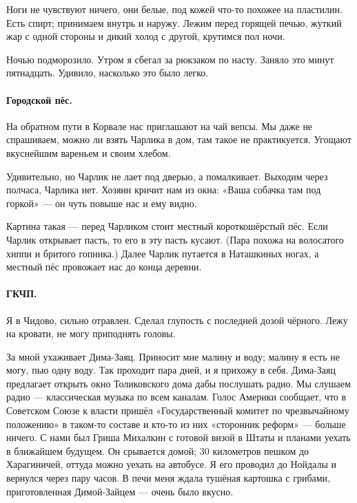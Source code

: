 \documentclass{book}
\begin{document}
Ноги не чувствуют ничего, они белые, под кожей что-то похожее на пластилин.
Есть спирт; принимаем внутрь и наружу.
Лежим перед горящей печью, жуткий жар с одной стороны и дикий холод с другой, крутимся пол ночи.

Ночью подморозило.
Утром я сбегал за рюкзаком по насту.
Заняло это минут пятнадцать.
Удивило, насколько это было легко.

\paragraph{Городской пёс.}

На обратном пути в Корвале нас приглашают на чай вепсы.
Мы даже не спрашиваем, можно ли взять Чарлика в дом, там такое не практикуется.
Угощают вкуснейшим вареньем и своим хлебом.

Удивительно, но Чарлик не лает под дверью, а помалкивает.
Выходим через полчаса, Чарлика нет.
Хозяин кричит нам из окна: «Ваша собачка там под горкой» --- он чуть повыше нас и ему видно.

Картина такая --- перед Чарликом стоит местный короткошёрстый пёс.
Если Чарлик открывает пасть, то его в эту пасть кусают.
(Пара похожа на волосатого хиппи и бритого гопника.)
Далее Чарлик путается в Наташкиных ногах, а местный пёс провожает нас до конца деревни.

\paragraph{ГКЧП.}

Я в Чидово, сильно отравлен.
Сделал глупость с последней дозой чёрного.
Лежу на кровати, не могу приподнять головы.

За мной ухаживает Дима-Заяц.
Приносит мне малину и воду; малину я есть не могу, пью одну воду.
Так проходит пара дней, и я прихожу в себя.
Дима-Заяц предлагает открыть окно Толиковского дома дабы послушать радио. 
Мы слушаем радио --- классическая музыка по всем каналам.
Голос Америки сообщает, что в Советском Союзе к власти пришёл «Государственный комитет по чрезвычайному положению» в таком-то составе и кто-то из них «сторонник реформ» --- больше ничего.
С нами был Гриша Михалкин с готовой визой в Штаты и планами уехать в ближайшем будущем.
Он срывается домой;
30 километров пешком до Харагиничей, оттуда можно уехать на автобусе.
Я его проводил до Нойдалы и вернулся через пару часов.
В печи меня ждала тушёная картошка с грибами, приготовленная Димой-Зайцем  --- очень было вкусно.
\end{document}
